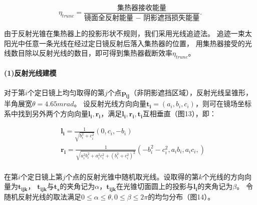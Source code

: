 \documentclass{article}
\numberwithin{equation}{subsection}
\begin{document}
\begin{equation}
    \eta_{trunc}=\frac{\text{集热器接收能量}}{\text{镜面全反射能量 − 阴影遮挡损失能量}}.
\end{equation}

\vskip 0.25cm
由于反射光锥在集热器上的投影形状不规则，我们采用光线追迹法。
追迹一束太阳光中任意一条光线在经过定日镜反射后落入集热器的位置，
用集热器接受的光线数目除以反射光线的数目，即可得到集热器截断效率$\eta_{trunc}$。

\paragraph{(1)反射光线建模}

对于第$i$个定日镜上均匀取得的第$j$个点$\bm{p_{ij}}$（非阴影遮挡区域），反射光线呈锥形，半角展宽$\theta=4.65mrad$。
设反射光线方向向量$\bm{t_i}=(a_i,b_i,c_i)$，则可在镜场坐标系中找到另外两个方向向量$\bm{l_i},\bm{r_i}$，满足$\bm{l_i},\bm{r_i},\bm{t_i}$互相垂直（图13），即：%

\begin{equation}
    \begin{aligned}
        &\bm{l_i}=\frac{1}{\sqrt{b_i^2+c_i^2}}\left(0,c_i,-b_i\right)\\
        &\bm{r_i}=\frac{1}{\sqrt{a_i^2b_i^2+a_i^2c_i^2+(b_i^2+c_i^2)^2}}\left(-b_i^2-c_i^2,a_i b_i,a_i c_i ,\right)\\
    \end{aligned}
\end{equation}

\vskip 0.25cm
\noindent
在第$i$个定日镜上第$j$个点的反射光锥中随机取光线。设取得的第$k$个光线的方向向量为$\bm{t_{ijk}}$，
$\bm{t_{ijk}}$与$\bm{t_s}$的夹角记为$\alpha$，$\bm{t_{ijk}}$在光锥切面圆上的投影与$\bm{l_i}$的夹角记为$\beta$。
令随机反射光线的取法满足$0\leq \alpha \leq\theta,0\leq \beta\leq 2\pi$的均匀分布（图14）。
\end{document}
